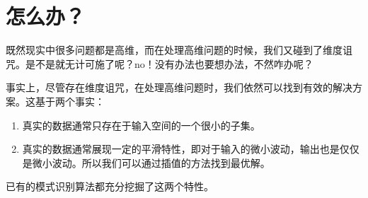 \documentclass[10pt,a4paper,UTF8]{article}
\begin{document}
\section{怎么办？}
\label{sec:org0353afe}


既然现实中很多问题都是高维，而在处理高维问题的时候，我们又碰到了维度诅咒。是不是就无计可施了呢？no！没有办法也要想办法，不然咋办呢？

事实上，尽管存在维度诅咒，在处理高维问题时，我们依然可以找到有效的解决方案。这基于两个事实：
\begin{enumerate}
\item 真实的数据通常只存在于输入空间的一个很小的子集。
\item 真实的数据通常展现一定的平滑特性，即对于输入的微小波动，输出也是仅仅是微小波动。所以我们可以通过插值的方法找到最优解。
\end{enumerate}

已有的模式识别算法都充分挖掘了这两个特性。
\end{document}
